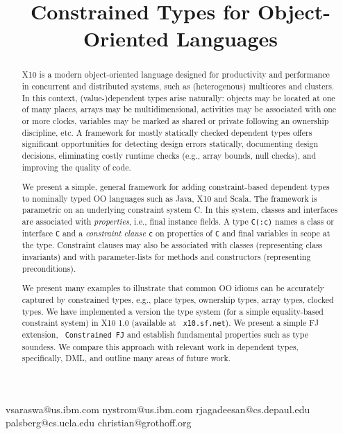 \documentclass[nocopyrightspace,preprint,9pt]{sigplanconf}
\newcommand\Xten{{X10}}
\newcommand\FJ{{FJ}}
\begin{document}
\title{Constrained Types for Object-Oriented Languages}
  {vsaraswa@us.ibm.com}
  {nystrom@us.ibm.com}
  {rjagadeesan@cs.depaul.edu}
  {palsberg@cs.ucla.edu}
  {christian@grothoff.org}

\maketitle


\begin{abstract}
\Xten{} is a modern object-oriented language designed for
productivity and performance in concurrent and distributed
systems, such as (heterogenous) multicores and clusters. In this
context, (value-)dependent types arise naturally: objects may be
located at one of many places, arrays may be multidimensional,
activities may be associated with one or more clocks, variables
may be marked as shared or private following an ownership
discipline, etc.  A framework for mostly statically checked
dependent types offers significant opportunities for detecting
design errors statically, documenting design decisions,
eliminating costly runtime checks (e.g., array bounds, null
checks), and improving the quality of code.

We present a simple, general framework for adding
constraint-based dependent types to nominally typed OO languages
such as Java, \Xten{} and Scala. The framework is parametric on
an underlying constraint system {\cal C}. In this system,
classes and interfaces are associated with {\em properties},
i.e., final instance fields. A type {\tt C(:c)} names a class or
interface {\tt C} and a {\em constraint clause} {\tt c} on
properties of {\tt C} and final variables in scope at the type.
Constraint clauses may also be associated with classes
(representing class invariants) and with parameter-lists for
methods and constructors (representing preconditions).

We present many examples to illustrate that common OO idioms can
be accurately captured by constrained types, e.g., place types,
ownership types, array types, clocked types. We have implemented
a version the type system (for a simple equality-based
constraint system) in \Xten{} 1.0 (available at {\tt
x10.sf.net}). We present a simple \FJ{} extension, {\tt
Constrained FJ} and establish fundamental properties such as
type soundess. We compare this approach with relevant work in
dependent types, specifically, DML, and outline many areas of
future work.
\end{abstract}
\end{document}
